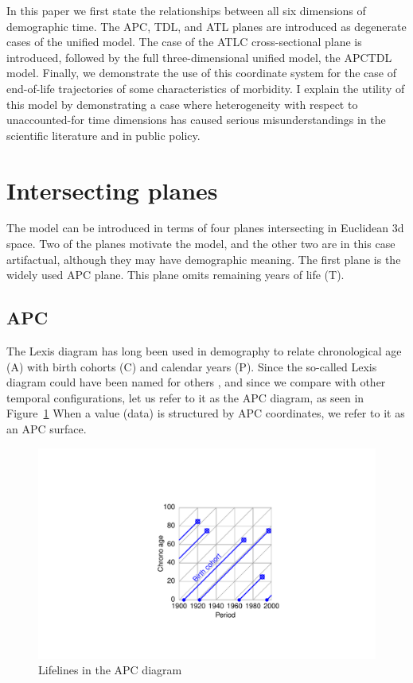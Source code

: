 \documentclass[11pt,oneside]{article} %
\begin{document}
In this paper we first state the relationships between all six dimensions of
demographic time. The APC, TDL, and ATL planes are introduced as degenerate
cases of the unified model. The case of the ATLC cross-sectional plane is
introduced, followed by the full three-dimensional unified model, the APCTDL
model.
Finally, we demonstrate the use of this coordinate system for the case of
end-of-life trajectories of some characteristics of morbidity. I explain the
utility of this model by demonstrating a case where heterogeneity with respect
to unaccounted-for time dimensions has caused serious misunderstandings in the
scientific literature and in public policy.

\section*{Intersecting planes}

The  model can be introduced in terms of four planes intersecting in
Euclidean 3d space. Two of the planes motivate the model, and the other two
are in this case artifactual, although they may have demographic meaning. The
first plane is the widely used APC plane. This plane omits remaining years of
life (T). 

\subsection*{APC}
The Lexis diagram has long been used in demography to relate chronological age
(A) with birth cohorts (C) and calendar years (P). Since the so-called Lexis
diagram could have been named for others
\citep{vandeschrick2001lexis,keiding2011age}, and since we compare with other
temporal configurations, let us refer to it as the APC diagram, as seen in
Figure~\ref{APCright}
When a value (data) is structured by APC coordinates, we refer to it as an APC surface.

\begin{figure}[b!]
    \centering
    \includegraphics[scale=.7]{Figures/LabPres/APC2.pdf}
    \caption{Lifelines in the APC diagram}
    \label{APCright}
\end{figure} 
\end{document}
